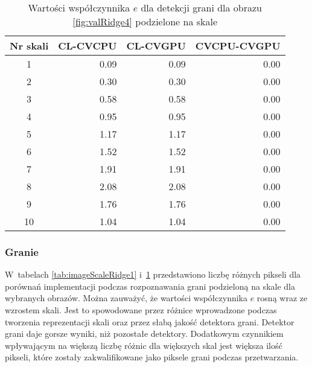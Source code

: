 \begin{center}
\begin{table}
\centering
\caption{Wartości współczynnika $ e $ dla detekcji grani dla obrazu \ref{fig:valRidge4} podzielone na skale}
\label{tab:imageScaleRidge4}
\begin{tabular}{|c|r|r|r|}
 \hline
Nr skali & CL-CVCPU & CL-CVGPU & CVCPU-CVGPU \\ \hline
1        & 0.09     & 0.09     & 0.00        \\ \hline
2        & 0.30     & 0.30     & 0.00        \\ \hline
3        & 0.58     & 0.58     & 0.00        \\ \hline
4        & 0.95     & 0.95     & 0.00        \\ \hline
5        & 1.17     & 1.17     & 0.00        \\ \hline
6        & 1.52     & 1.52     & 0.00        \\ \hline
7        & 1.91     & 1.91     & 0.00        \\ \hline
8        & 2.08     & 2.08     & 0.00        \\ \hline
9        & 1.76     & 1.76     & 0.00        \\ \hline
10       & 1.04     & 1.04     & 0.00        \\ \hline
\end{tabular}
\end{table}
\end{center}

\subsubsection{Granie}
\label{subsubsec:granieTabele}

W~tabelach \ref{tab:imageScaleRidge1} i~\ref{tab:imageScaleRidge4} przedstawiono liczbę różnych pikseli dla porównań implementacji podczas rozpoznawania grani podzieloną na skale dla wybranych obrazów. Można zauważyć, że wartości współczynnika $ e $ rosną wraz ze wzrostem skali. Jest to spowodowane przez różnice wprowadzone podczas tworzenia reprezentacji skali oraz przez słabą jakość detektora grani. Detektor grani daje gorsze wyniki, niż pozostałe detektory. Dodatkowym czynnikiem wpływającym na większą liczbę różnic dla większych skal jest większa ilość pikseli, które zostały zakwalifikowane jako piksele grani podczas przetwarzania.

